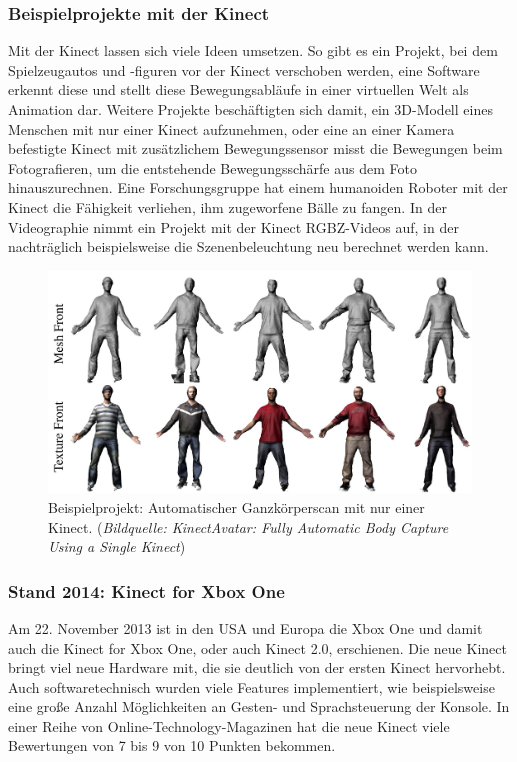 \documentclass[12pt,a4paper,ngerman]{scrartcl}
\begin{document}
\subsubsection{Beispielprojekte mit der Kinect}

Mit der Kinect lassen sich viele Ideen umsetzen. So gibt es ein Projekt, bei dem Spielzeugautos und
-figuren vor der Kinect verschoben werden, eine Software erkennt diese und stellt diese Bewegungsabläufe
in einer virtuellen Welt als Animation dar.\cite{3dpuppetry} Weitere Projekte beschäftigten sich
damit, ein 3D-Modell eines Menschen mit nur einer Kinect aufzunehmen,\cite{kinectavatar} oder eine an einer Kamera
befestigte Kinect mit zusätzlichem Bewegungssensor misst die Bewegungen beim Fotografieren, um die
entstehende Bewegungsschärfe aus dem Foto hinauszurechnen.\cite{motiondeblurring} Eine Forschungsgruppe
hat einem humanoiden Roboter mit der Kinect die Fähigkeit verliehen, ihm zugeworfene Bälle zu fangen.\cite{kober}
In der Videographie nimmt ein Projekt mit der Kinect RGBZ-Videos auf, in der nachträglich beispielsweise die
Szenenbeleuchtung neu berechnet werden kann.\cite{rgbzvideos}

\begin{figure}[H]
    \centering
    \includegraphics[scale=0.3]{img/kinectavatar.jpg}
    \caption{Beispielprojekt: Automatischer Ganzkörperscan mit nur einer Kinect. ({\em Bildquelle: KinectAvatar: Fully Automatic Body Capture Using a Single Kinect\cite{kinectavatar}})}
\end{figure}

\subsubsection{Stand 2014: Kinect for Xbox One}
Am 22. November 2013 ist in den USA und Europa die Xbox One und damit auch die Kinect for Xbox One, oder auch Kinect 2.0, erschienen.\cite{kinect2:wikikinect} Die neue Kinect bringt viel neue Hardware mit, die sie deutlich von der ersten Kinect hervorhebt. Auch softwaretechnisch wurden viele Features implementiert, wie beispielsweise eine große Anzahl Möglichkeiten an Gesten- und Sprachsteuerung der Konsole.\cite{kinect2:gesturevoice} In einer Reihe von Online-Technology-Magazinen hat die neue Kinect viele Bewertungen von 7 bis 9 von 10 Punkten bekommen.\cite{kinect2:wikikinect}
\end{document}
